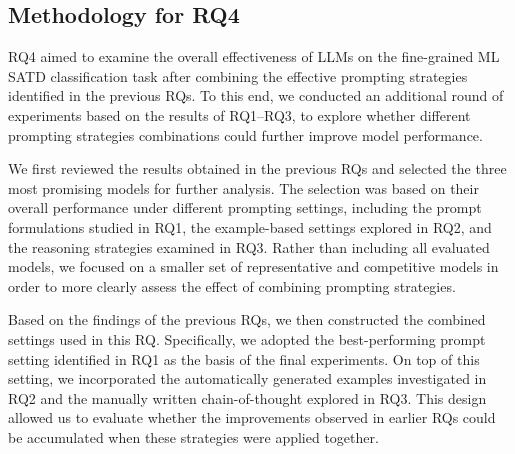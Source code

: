 \documentclass[acmsmall,screen,review,anonymous]{acmart}
\begin{document}

\subsection{Methodology for RQ4}
\label{sec:RQ4}

RQ4 aimed to examine the overall effectiveness of LLMs on the fine-grained ML SATD classification task after combining the effective prompting strategies identified in the previous RQs. To this end, we conducted an additional round of experiments based on the results of RQ1--RQ3, to explore whether different prompting strategies combinations could further improve model performance.

We first reviewed the results obtained in the previous RQs and selected the three most promising models for further analysis. The selection was based on their overall performance under different prompting settings, including the prompt formulations studied in RQ1, the example-based settings explored in RQ2, and the reasoning strategies examined in RQ3. Rather than including all evaluated models, we focused on a smaller set of representative and competitive models in order to more clearly assess the effect of combining prompting strategies.

Based on the findings of the previous RQs, we then constructed the combined settings used in this RQ. Specifically, we adopted the best-performing prompt setting identified in RQ1 as the basis of the final experiments. On top of this setting, we incorporated the automatically generated examples investigated in RQ2 and the manually written chain-of-thought explored in RQ3. This design allowed us to evaluate whether the improvements observed in earlier RQs could be accumulated when these strategies were applied together.
\end{document}
